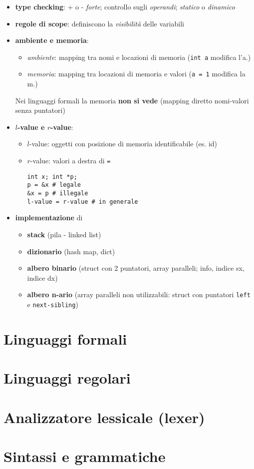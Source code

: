 \begin{itemize}
  \item \textbf{type checking}: + o - \textit{forte}; controllo sugli \textit{operandi}; \textit{statico} o \textit{dinamico}
  \item \textbf{regole di scope}: definiscono la \textit{visibilit\`a} delle variabili
  \item \textbf{ambiente e memoria}:
    \begin{itemize}
      \item \textit{ambiente}: mapping tra nomi e locazioni di memoria (\lstinline|int a| modifica l'a.)
      \item \textit{memoria}: mapping tra locazioni di memoria e valori (\lstinline|a = 1| modifica la m.)
    \end{itemize}
    Nei linguaggi formali la memoria \textbf{non si vede} (mapping diretto nomi-valori senza puntatori)
  \item \textbf{$l$-value e $r$-value}:
    \begin{itemize}
      \item $l$-value: oggetti con posizione di memoria identificabile (es. id)
      \item $r$-value: valori a destra di \lstinline|=|
        \begin{lstlisting}
int x; int *p;
p = &x # legale
&x = p # illegale
l-value = r-value # in generale\end{lstlisting}
    \end{itemize}
  \item \textbf{implementazione} di
    \begin{itemize}
      \item \textbf{stack} (pila - linked list)
      \item \textbf{dizionario} (hash map, dict)
      \item \textbf{albero binario} (struct con 2 puntatori, array paralleli; info, indice sx, indice dx)
      \item \textbf{albero n-ario} (array paralleli non utilizzabili: struct con puntatori \lstinline|left| e \lstinline|next-sibling|)
    \end{itemize}
    
\end{itemize}

\section{Linguaggi formali}
\section{Linguaggi regolari}
\section{Analizzatore lessicale (lexer)}
\section{Sintassi e grammatiche}


